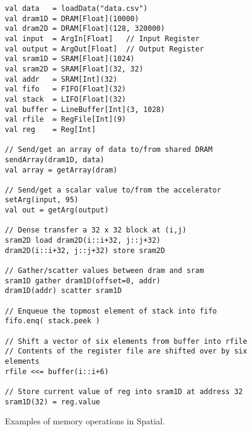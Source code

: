 \begin{figure}
\centering\hspace{40pt}\begin{lstlisting}[language=SpatialTable]
val data   = loadData("data.csv")
val dram1D = DRAM[Float](10000)
val dram2D = DRAM[Float](128, 320000)
val input  = ArgIn[Float]   // Input Register
val output = ArgOut[Float]  // Output Register
val sram1D = SRAM[Float](1024)
val sram2D = SRAM[Float](32, 32)
val addr   = SRAM[Int](32)
val fifo   = FIFO[Float](32)
val stack  = LIFO[Float](32)
val buffer = LineBuffer[Int](3, 1028)
val rfile  = RegFile[Int](9)
val reg    = Reg[Int]

// Send/get an array of data to/from shared DRAM
sendArray(dram1D, data)
val array = getArray(dram)

// Send/get a scalar value to/from the accelerator
setArg(input, 95)
val out = getArg(output)

// Dense transfer a 32 x 32 block at (i,j)
sram2D load dram2D(i::i+32, j::j+32)
dram2D(i::i+32, j::j+32) store sram2D

// Gather/scatter values between dram and sram
sram1D gather dram1D(offset=0, addr)
dram1D(addr) scatter sram1D

// Enqueue the topmost element of stack into fifo
fifo.enq( stack.peek )

// Shift a vector of six elements from buffer into rfile
// Contents of the register file are shifted over by six elements
rfile <<= buffer(i::i+6)

// Store current value of reg into sram1D at address 32
sram1D(32) = reg.value
\end{lstlisting}
\caption{Examples of memory operations in Spatial.}
\label{f:memexamples}
\end{figure}
